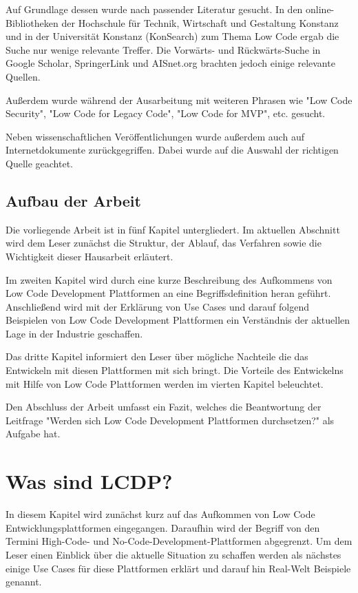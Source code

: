 \documentclass[12pt]{article} %
\begin{document}
	Auf Grundlage dessen wurde nach passender Literatur gesucht. In den online-Bibliotheken der Hochschule für Technik, Wirtschaft und Gestaltung Konstanz und in der Universität Konstanz (KonSearch) zum Thema Low Code ergab die Suche nur wenige relevante Treffer. Die Vorwärts- und Rückwärts-Suche in Google Scholar, SpringerLink und AISnet.org brachten jedoch einige relevante Quellen. 
	
	Außerdem wurde während der Ausarbeitung mit weiteren Phrasen wie "Low Code Security", "Low Code for Legacy Code", "Low Code for MVP", etc. gesucht. \newline 
	 
	Neben wissenschaftlichen Veröffentlichungen wurde außerdem auch auf Internetdokumente zurückgegriffen. Dabei wurde auf die Auswahl der richtigen Quelle geachtet.
	
	\subsection{Aufbau der Arbeit}
	Die vorliegende Arbeit ist in fünf Kapitel untergliedert. Im aktuellen Abschnitt wird dem Leser zunächst die Struktur, der Ablauf, das Verfahren sowie die Wichtigkeit dieser Hausarbeit erläutert. \newline
	
	Im zweiten Kapitel wird durch eine kurze Beschreibung des Aufkommens von Low Code Development Plattformen an eine Begriffsdefinition heran geführt. Anschließend wird mit der Erklärung von Use Cases und darauf folgend Beispielen von Low Code Development Plattformen ein Verständnis der aktuellen Lage in der Industrie geschaffen. \newline
	
	Das dritte Kapitel informiert den Leser über mögliche Nachteile die das Entwickeln mit diesen Plattformen mit sich bringt. 
	Die Vorteile des Entwickelns mit Hilfe von Low Code Plattformen werden im vierten Kapitel beleuchtet. \newline
	
	Den Abschluss der Arbeit umfasst ein Fazit, welches die Beantwortung der Leitfrage "Werden sich Low Code Development Plattformen durchsetzen?" als Aufgabe hat. 
	
	\section{Was sind LCDP?}
	In diesem Kapitel wird zunächst kurz auf das Aufkommen von Low Code Entwicklungsplattformen eingegangen. Daraufhin wird der Begriff von den Termini High-Code- und No-Code-Development-Plattformen abgegrenzt. Um dem Leser einen Einblick über die aktuelle Situation zu schaffen werden als nächstes einige Use Cases für diese Plattformen erklärt und darauf hin Real-Welt Beispiele genannt. 
	
\end{document}
